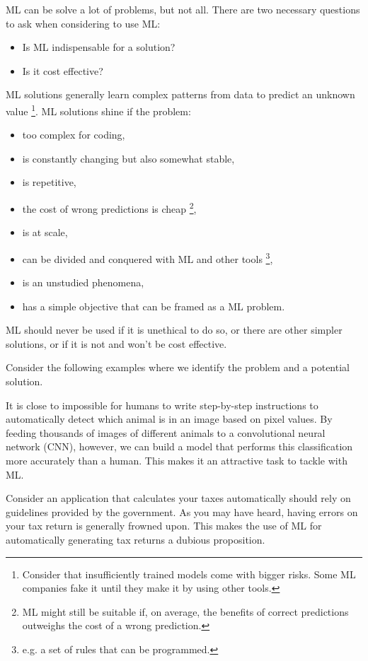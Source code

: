 ML can be solve a lot of problems, but not all. There are two
necessary questions to ask when considering to use ML:
\begin{itemize}
    \item Is ML indispensable for a solution?
    \item Is it cost effective?
\end{itemize}
ML solutions generally learn complex patterns from data to predict
an unknown value
\footnote{
    Consider that insufficiently trained models come with bigger
    risks. Some ML companies fake it until they make it by using
    other tools.
}.
ML solutions shine if the problem:
\begin{itemize}
    \item too complex for coding,
    \item is constantly changing but also somewhat stable,
    \item is repetitive,
    \item the cost of wrong predictions is cheap
    \footnote{
        ML might still be suitable if, on average, the benefits 
        of correct predictions outweighs the cost of a wrong
        prediction.
    },
    \item is at scale,
    \item can be divided and conquered with ML and other tools
    \footnote{
        e.g. a set of rules that can be programmed.
    },
    \item is an unstudied phenomena,
    \item has a simple objective that can be framed as a ML
    problem.
\end{itemize}
ML should never be used if it is unethical to do so, or there are
other simpler solutions, or if it is not and won't be cost effective.

Consider the following examples where we identify the problem and
a potential solution.

It is close to impossible for humans to write step-by-step
instructions to automatically detect which animal is in an image
based on pixel values. By feeding thousands of images of different
animals to a convolutional neural network (CNN), however, we can
build a model that performs this classification more accurately
than a human. This makes it an attractive task to tackle with ML.

Consider an application that calculates your taxes automatically
should rely on guidelines provided by the government. As you may
have heard, having errors on your tax return is generally frowned
upon. This makes the use of ML for automatically generating tax
returns a dubious proposition.



